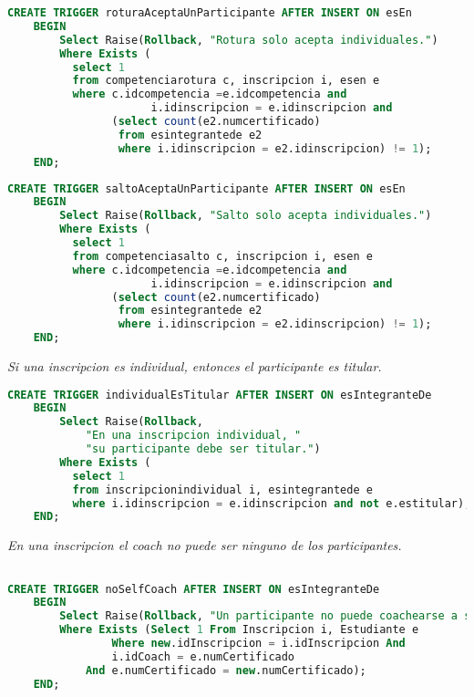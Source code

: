 \begin{lstlisting}[language=SQL]
CREATE TRIGGER roturaAceptaUnParticipante AFTER INSERT ON esEn
    BEGIN
        Select Raise(Rollback, "Rotura solo acepta individuales.")
        Where Exists (
          select 1
          from competenciarotura c, inscripcion i, esen e
          where c.idcompetencia =e.idcompetencia and
                      i.idinscripcion = e.idinscripcion and
                (select count(e2.numcertificado)
                 from esintegrantede e2
                 where i.idinscripcion = e2.idinscripcion) != 1);
    END;
\end{lstlisting}

\begin{lstlisting}[language=SQL]
CREATE TRIGGER saltoAceptaUnParticipante AFTER INSERT ON esEn
    BEGIN
        Select Raise(Rollback, "Salto solo acepta individuales.")
        Where Exists (
          select 1
          from competenciasalto c, inscripcion i, esen e
          where c.idcompetencia =e.idcompetencia and
                      i.idinscripcion = e.idinscripcion and
                (select count(e2.numcertificado)
                 from esintegrantede e2
                 where i.idinscripcion = e2.idinscripcion) != 1);
    END;
\end{lstlisting}

\emph{Si una inscripcion es individual, entonces el participante es titular.}

\begin{lstlisting}[language=SQL]
CREATE TRIGGER individualEsTitular AFTER INSERT ON esIntegranteDe
    BEGIN
        Select Raise(Rollback,
            "En una inscripcion individual, "
            "su participante debe ser titular.")
        Where Exists (
          select 1
          from inscripcionindividual i, esintegrantede e
          where i.idinscripcion = e.idinscripcion and not e.estitular);
    END;
\end{lstlisting}

\emph{En una inscripcion el coach no puede ser ninguno de los participantes.}

\begin{lstlisting}[language=SQL]

CREATE TRIGGER noSelfCoach AFTER INSERT ON esIntegranteDe
    BEGIN
        Select Raise(Rollback, "Un participante no puede coachearse a si mismo.")
        Where Exists (Select 1 From Inscripcion i, Estudiante e
                Where new.idInscripcion = i.idInscripcion And 
                i.idCoach = e.numCertificado
            And e.numCertificado = new.numCertificado);
    END;
\end{lstlisting}
  
